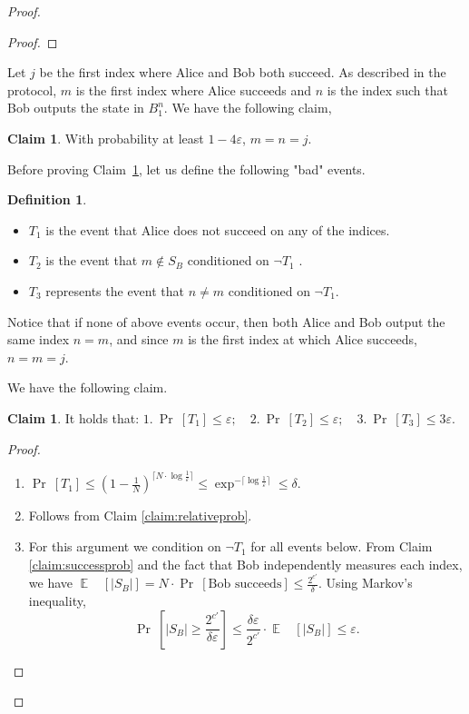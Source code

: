 \documentclass[11pt,a4paper]{article}
\theoremstyle{plain}
\theoremstyle{definition}
\newtheorem{definition}[theorem]{Definition}
\newtheorem{claim}[theorem]{Claim}
\newcommand {\br} [1] {\ensuremath{ \left( #1 \right) }}
\newcommand {\Br} [1] {\ensuremath{ \left[ #1 \right] }}
\newcommand {\minusspace} {\: \! \!}
\newcommand {\Fn} [2] {\ensuremath{ #1 \minusspace \Br{ #2 } }}
\newcommand {\prob} [1] {\Fn{\Pr}{#1}}
\newcommand {\abs} [1] {\ensuremath{ \left| #1 \right| }}
\DeclareMathOperator*{\bigE}{\mathbb{E}}
\newcommand {\expec} [2] {\Fn{\bigE_{\substack{#1}}}{#2}}
\def\ve{{\varepsilon}}
\begin{document}
\begin{proof}
\begin{proof}
\end{proof}

Let $j$ be the first index where Alice and Bob both succeed. As described in the protocol, $m$ is the first index where Alice succeeds and $n$ is the index such that Bob outputs the state in $B_1^n$. 
We have the following claim, 

\begin{claim}
\label{claim:highprobindex}
With probability at least $1-4\ve$, $m=n=j$.
\end{claim}

Before proving Claim~\ref{claim:highprobindex}, let us define the following "bad" events.
\begin{definition}\label{def:badevent}
\begin{itemize}

\item $T_1$ is the event that Alice does not succeed on any of the indices.

\item $T_2$ is the event that $m \notin S_B$ conditioned on $\neg T_1$ .
\item $T_3$ represents the event that $n \neq m$ conditioned on $\neg T_1$.
\end{itemize}
\end{definition}

Notice that if none of above events occur, then both Alice and Bob output the same index $n=m$, and since $m$ is the first index at which Alice succeeds, $n=m=j$. 

We have the following claim.

\begin{claim}\label{claim:protocol}
It holds that: \quad $1. ~ \prob{T_1}\leq \ve; \quad 2. ~ \prob{T_2}\leq\ve; \quad 3. ~ \prob{T_3}\leq3\ve.$
\end{claim}
\begin{proof}

\begin{enumerate}

\item $\prob{T_1}\leq\br{1-\frac{1}{N}}^{\lceil N \cdot \log\frac{1}{\ve}\rceil}\leq \exp^{-\lceil\log\frac{1}{\ve}\rceil}\leq  \delta$.

\item Follows from Claim \ref{claim:relativeprob}.

\item For this argument we condition on $\neg T_1$ for all events below. From Claim \ref{claim:successprob} and the fact that Bob independently measures each index, we have  $\expec{}{\abs{S_B}}= N\cdot \prob{\text{Bob succeeds}} \leq \frac{2^{c'}}{\delta}$. Using Markov's inequality, 
\begin{equation} \label{eq:sb} 
\prob{\abs{S_B} \geq \frac{2^{c'}}{\delta\ve}}\leq \frac{\delta\ve}{2^{c'}} \cdot \expec{}{\abs{S_B}} \leq \ve . 
\end{equation}


\end{enumerate}
\end{proof}
\end{proof}
\end{document}

